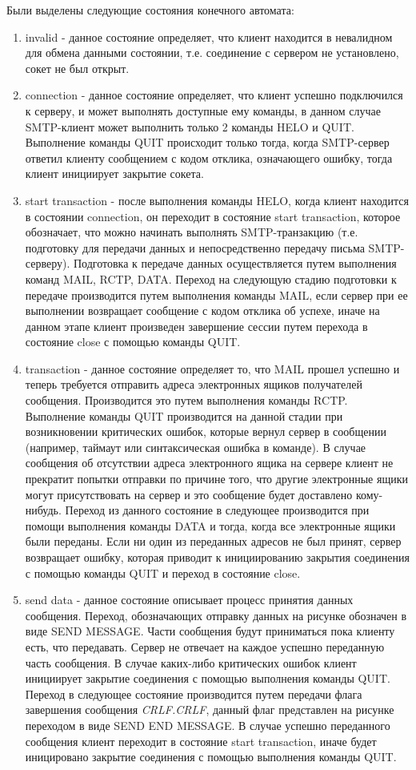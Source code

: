 \documentclass[a4paper,12pt]{report}
\begin{document}
	Были выделены следующие состояния конечного автомата:
	\begin{enumerate}
		\item invalid - данное состояние определяет, что клиент находится в невалидном для обмена данными состоянии, т.е. соединение с сервером не установлено, сокет не был открыт.
		\item connection - данное состояние определяет, что клиент успешно подключился к серверу, и может выполнять доступные ему команды, в данном случае SMTP-клиент может выполнить только 2 команды HELO и QUIT. Выполнение команды QUIT происходит только тогда, когда SMTP-сервер ответил клиенту сообщением с кодом отклика, означающего ошибку, тогда клиент инициирует закрытие сокета.
		\item start transaction - после выполнения команды HELO, когда клиент находится в состоянии connection, он переходит в состояние start transaction, которое обозначает, что можно начинать выполнять SMTP-транзакцию (т.е. подготовку для передачи данных и непосредственно передачу письма SMTP-серверу). Подготовка к передаче данных осуществляется путем выполнения команд MAIL, RCTP, DATA. Переход на следующую стадию подготовки к передаче производится путем выполнения команды MAIL, если сервер при ее выполнении возвращает сообщение с кодом отклика об успехе, иначе на данном этапе клиент произведен завершение сессии путем перехода в состояние close с помощью команды QUIT.
		\item transaction - данное состояние определяет то, что MAIL прошел успешно и теперь требуется отправить адреса электронных ящиков получателей сообщения. Производится это путем выполнения команды RCTP. Выполнение команды QUIT производится на данной стадии при возникновении критических ошибок, которые вернул сервер в сообщении (например, таймаут или синтаксическая ошибка в команде). В случае сообщения об отсутствии адреса электронного ящика на сервере клиент не прекратит попытки отправки по причине того, что другие электронные ящики могут присутствовать на сервер и это сообщение будет доставлено кому-нибудь. Переход из данного состояние в следующее производится при помощи выполнения команды DATA и тогда, когда все электронные ящики были переданы. Если ни один из переданных адресов не был принят, сервер возвращает ошибку, которая приводит к инициированию закрытия соединения с помощью команды QUIT и переход в состояние close.
		\item send data - данное состояние описывает процесс принятия данных сообщения. Переход, обозначающих отправку данных на рисунке обозначен в виде SEND MESSAGE. Части сообщения будут приниматься пока клиенту есть, что передавать. Сервер не отвечает на каждое успешно переданную часть сообщения. В случае каких-либо критических ошибок клиент инициирует закрытие соединения с помощью выполнения команды QUIT. Переход в следующее состояние производится путем передачи флага завершения сообщения \textit{CRLF.CRLF}, данный флаг представлен на рисунке переходом в виде SEND END MESSAGE. В случае успешно переданного сообщения клиент переходит в состояние start transaction, иначе будет иницировано закрытие соединения с помощью выполнения команды QUIT.
	\end{enumerate}
\end{document}
